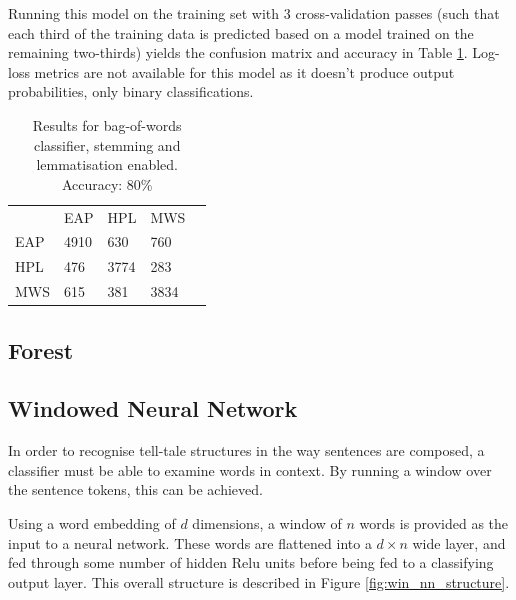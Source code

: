Running this model on the training set with 3 cross-validation passes (such that each third of the training data is predicted based on a model trained on the remaining two-thirds) yields the confusion matrix and accuracy in Table \ref{tab:bow_cw}. Log-loss metrics are not available for this model as it doesn't produce output probabilities, only binary classifications.

\begin{table}[h]
\centering
\begin{tabular}{m{1cm}|m{1cm}|m{1cm}|m{1cm}|m{0cm}}
\multicolumn{1}{m{1cm}}{} & \multicolumn{1}{m{1cm}}{EAP} & \multicolumn{1}{m{1cm}}{HPL} & \multicolumn{1}{m{1cm}}{MWS} &\\[5pt]
\cline{2-4}
EAP & 4910 & 630 & 760 & \\[5pt]
\cline{2-4}
HPL & 476 & 3774 & 283 & \\[5pt]
\cline{2-4}
MWS & 615 & 381 & 3834 & \\[5pt]
\cline{2-4}
\end{tabular}
\caption{Results for bag-of-words classifier, stemming and lemmatisation enabled.\\Accuracy: 80\%}
\label{tab:bow_cw}
\end{table}

\subsection{Forest}
\label{sec:forest}

\subsection{Windowed Neural Network}
In order to recognise tell-tale structures in the way sentences are composed, a classifier must be able to examine words in context. By running a window over the sentence tokens, this can be achieved.

Using a word embedding of $d$ dimensions, a window of $n$ words is provided as the input to a neural network. These words are flattened into a $d \times n$ wide layer, and fed through some number of hidden Relu units before being fed to a classifying output layer. This overall structure is described in Figure \ref{fig:win_nn_structure}.

